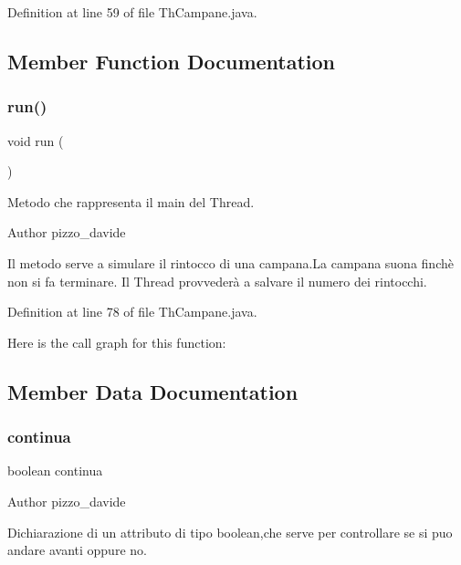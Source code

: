 Definition at line 59 of file Th\+Campane.\+java.



\subsection{Member Function Documentation}
\mbox{\label{classcampane_1_1_th_campane_a13a43e6d814de94978c515cb084873b1}} 
\subsubsection{\texorpdfstring{run()}{run()}}
{\footnotesize\ttfamily void run (\begin{DoxyParamCaption}{ }\end{DoxyParamCaption})}



Metodo che rappresenta il main del Thread. 

\begin{DoxyAuthor}{Author}
pizzo\+\_\+davide
\end{DoxyAuthor}
Il metodo serve a simulare il rintocco di una campana.\+La campana suona finchè non si fa terminare. Il Thread provvederà a salvare il numero dei rintocchi. 

Definition at line 78 of file Th\+Campane.\+java.

Here is the call graph for this function\+:


\subsection{Member Data Documentation}
\mbox{\label{classcampane_1_1_th_campane_a135f40f8b2d0ba748791e390adac4e13}} 
\subsubsection{\texorpdfstring{continua}{continua}}
{\footnotesize\ttfamily boolean continua\hspace{0.3cm}{\ttfamily [private]}}

\begin{DoxyAuthor}{Author}
pizzo\+\_\+davide
\end{DoxyAuthor}
Dichiarazione di un attributo di tipo boolean,che serve per controllare se si puo andare avanti oppure no. 

